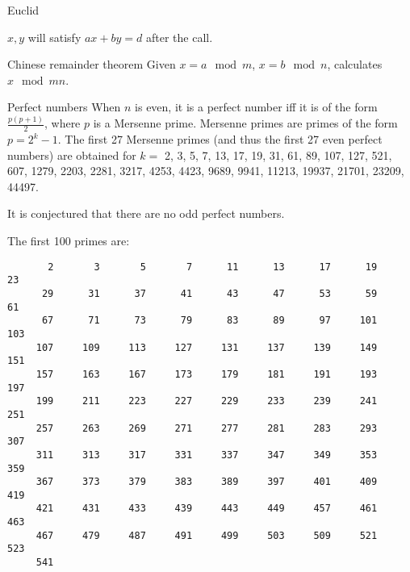 \categorycontents{}


\begin{algorithm}{Euclid}

\desc
$x, y$ will satisfy $ax+by=d$ after the call.
\end{algorithm}

\begin{algorithm}{Chinese remainder theorem}
\desc
Given $x=a\mod m$, $x=b\mod n$, calculates $x\mod mn$.
\end{algorithm}

\begin{algorithm}{Perfect numbers}
\desc
When $n$ is even, it is a perfect number iff it is of the form
$\frac{p (p+1)}{2}$, where $p$ is a Mersenne prime. Mersenne primes are primes
of the form $p = 2^k - 1$. The first 27 Mersenne primes (and thus the first 27
even perfect numbers) are obtained for $k =$ 2, 3, 5, 7, 13, 17, 19, 31, 61,
89, 107, 127, 521, 607, 1279, 2203, 2281, 3217, 4253, 4423, 9689, 9941, 11213,
19937, 21701, 23209, 44497.

It is conjectured that there are no odd perfect numbers.
\end{algorithm}


The first 100 primes are:
{\small
\begin{verbatim}
       2       3       5       7      11      13      17      19      23 
      29      31      37      41      43      47      53      59      61 
      67      71      73      79      83      89      97     101     103 
     107     109     113     127     131     137     139     149     151 
     157     163     167     173     179     181     191     193     197 
     199     211     223     227     229     233     239     241     251 
     257     263     269     271     277     281     283     293     307 
     311     313     317     331     337     347     349     353     359 
     367     373     379     383     389     397     401     409     419 
     421     431     433     439     443     449     457     461     463 
     467     479     487     491     499     503     509     521     523 
     541
\end{verbatim}
}

